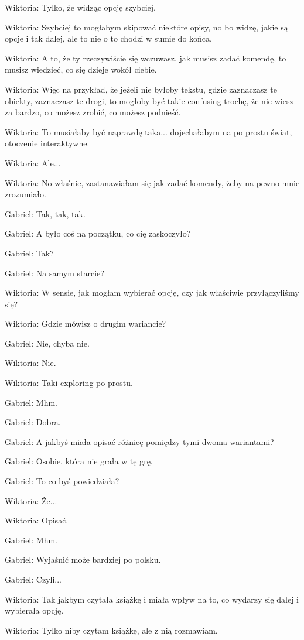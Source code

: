 Wiktoria: Tylko, że widząc opcję szybciej,

Wiktoria: Szybciej to mogłabym skipować niektóre opisy, no bo widzę, jakie są opcje i tak dalej, ale to nie o to chodzi w sumie do końca.

Wiktoria: A to, że ty rzeczywiście się wczuwasz, jak musisz zadać komendę, to musisz wiedzieć, co się dzieje wokół ciebie.

Wiktoria: Więc na przykład, że jeżeli nie byłoby tekstu, gdzie zaznaczasz te obiekty, zaznaczasz te drogi, to mogłoby być takie confusing trochę, że nie wiesz za bardzo, co możesz zrobić, co możesz podnieść.

Wiktoria: To musiałaby być naprawdę taka... dojechałabym na po prostu świat, otoczenie interaktywne.

Wiktoria: Ale...

Wiktoria: No właśnie, zastanawiałam się jak zadać komendy, żeby na pewno mnie zrozumiało.

Gabriel: Tak, tak, tak.

Gabriel: A było coś na początku, co cię zaskoczyło?

Gabriel: Tak?

Gabriel: Na samym starcie?

Wiktoria: W sensie, jak mogłam wybierać opcję, czy jak właściwie przyłączyliśmy się?

Wiktoria: Gdzie mówisz o drugim wariancie?

Gabriel: Nie, chyba nie.

Wiktoria: Nie.

Wiktoria: Taki exploring po prostu.

Gabriel: Mhm.

Gabriel: Dobra.

Gabriel: A jakbyś miała opisać różnicę pomiędzy tymi dwoma wariantami?

Gabriel: Osobie, która nie grała w tę grę.

Gabriel: To co byś powiedziała?

Wiktoria: Że...

Wiktoria: Opisać.

Gabriel: Mhm.

Gabriel: Wyjaśnić może bardziej po polsku.

Gabriel: Czyli...

Wiktoria: Tak jakbym czytała książkę i miała wpływ na to, co wydarzy się dalej i wybierała opcję.

Wiktoria: Tylko niby czytam książkę, ale z nią rozmawiam.

